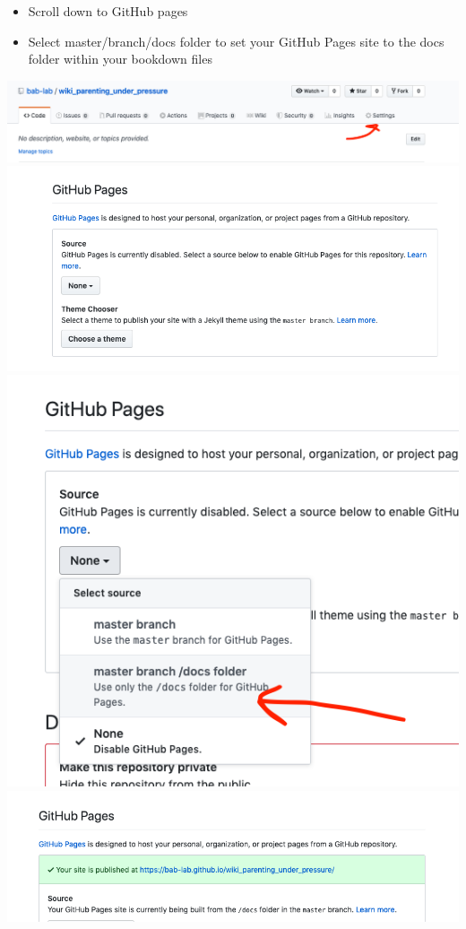 \documentclass[]{book}
\providecommand{\tightlist}{%
  \setlength{\itemsep}{0pt}\setlength{\parskip}{0pt}}
\begin{document}
\begin{itemize}
\tightlist
\item
  Scroll down to GitHub pages
\item
  Select master/branch/docs folder to set your GitHub Pages site to the
  docs folder within your bookdown files
\end{itemize}

\includegraphics{images/research_protocols/wiki/3.png}
\includegraphics{images/research_protocols/wiki/4.png}
\includegraphics{images/research_protocols/wiki/5.png}
\includegraphics{images/research_protocols/wiki/6.png}
\end{document}

